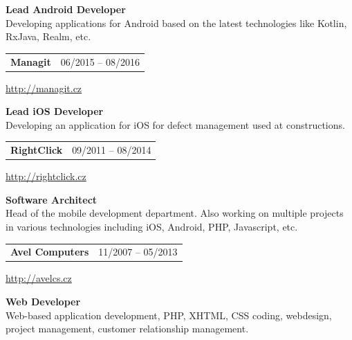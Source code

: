 \documentclass[10pt]{article} %
\begin{document}
{\begin{minipage}[t]{0.44\textwidth}
\medskip
\normalsize\textbf{Lead Android Developer}\\
\small {Developing applications for Android based on the latest \newline technologies like Kotlin, RxJava,
Realm, etc.}\\
\medskip 


\begin{tabularx}{\textwidth}{@{}Xr@{}}
\large\textbf{Managit} & \small\textsc{06/2015 -- 08/2016} \\
\end{tabularx}
\normalsize\url{http://managit.cz}

\medskip
\normalsize\textbf{Lead iOS Developer}\\
\small {Developing an application for iOS for defect management used at constructions.}\\
\medskip 


\begin{tabularx}{\textwidth}{@{}Xr@{}}
\large\textbf{RightClick} & \small\textsc{09/2011 -- 08/2014} \\
\end{tabularx}
\normalsize\url{http://rightclick.cz}

\medskip
\normalsize\textbf{Software Architect}\\
\small {Head of the mobile development department. Also working on multiple projects in various technologies including iOS, Android, PHP, Javascript, etc.}\\
\medskip 


\begin{tabularx}{\textwidth}{@{}Xr@{}}
\large\textbf{Avel Computers} & \small\textsc{11/2007 -- 05/2013} \\
\end{tabularx}
\normalsize\url{http://avelcs.cz}

\medskip
\normalsize\textbf{Web Developer}\\
\small {Web-based application development, PHP, XHTML, CSS coding, webdesign, project management, customer relationship management.}\\
\medskip 


\end{minipage} %

\newpage

\begin{minipage}[t]{0.5\textwidth} %
\vspace{0pt} %


\end{minipage}}
\end{document}
